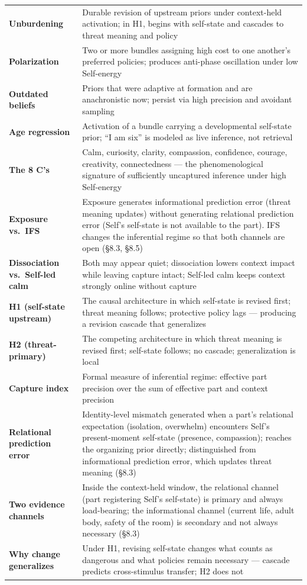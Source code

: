 \documentclass[12pt,a4paper]{article}
\begin{document}
{\begin{longtable}[]{@{}
  >{\raggedright\arraybackslash}p{}
  >{\raggedright\arraybackslash}p{}@{}}
\textbf{Unburdening} & Durable revision of upstream priors under
context-held activation; in H1, begins with self-state and cascades to
threat meaning and policy \\
\textbf{Polarization} & Two or more bundles assigning high cost to one
another's preferred policies; produces anti-phase oscillation under low
Self-energy \\
\textbf{Outdated beliefs} & Priors that were adaptive at formation and
are anachronistic now; persist via high precision and avoidant
sampling \\
\textbf{Age regression} & Activation of a bundle carrying a
developmental self-state prior; ``I am six'' is modeled as live
inference, not retrieval \\
\textbf{The 8 C's} & Calm, curiosity, clarity, compassion, confidence,
courage, creativity, connectedness --- the phenomenological signature of
sufficiently uncaptured inference under high Self-energy \\
\textbf{Exposure vs.~IFS} & Exposure generates informational prediction
error (threat meaning updates) without generating relational prediction
error (Self's self-state is not available to the part). IFS changes the
inferential regime so that both channels are open (§8.3, §8.5) \\
\textbf{Dissociation vs.~Self-led calm} & Both may appear quiet;
dissociation lowers context impact while leaving capture intact;
Self-led calm keeps context strongly online without capture \\
\textbf{H1 (self-state upstream)} & The causal architecture in which
self-state is revised first; threat meaning follows; protective policy
lags --- producing a revision cascade that generalizes \\
\textbf{H2 (threat-primary)} & The competing architecture in which
threat meaning is revised first; self-state follows; no cascade;
generalization is local \\
\textbf{Capture index} & Formal measure of inferential regime: effective
part precision over the sum of effective part and context precision \\
\textbf{Relational prediction error} & Identity-level mismatch generated
when a part's relational expectation (isolation, overwhelm) encounters
Self's present-moment self-state (presence, compassion); reaches the
organizing prior directly; distinguished from informational prediction
error, which updates threat meaning (§8.3) \\
\textbf{Two evidence channels} & Inside the context-held window, the
relational channel (part registering Self's self-state) is primary and
always load-bearing; the informational channel (current life, adult
body, safety of the room) is secondary and not always necessary
(§8.3) \\
\textbf{Why change generalizes} & Under H1, revising self-state changes
what counts as dangerous and what policies remain necessary --- cascade
predicts cross-stimulus transfer; H2 does not \\
\end{longtable}
}
\end{document}

